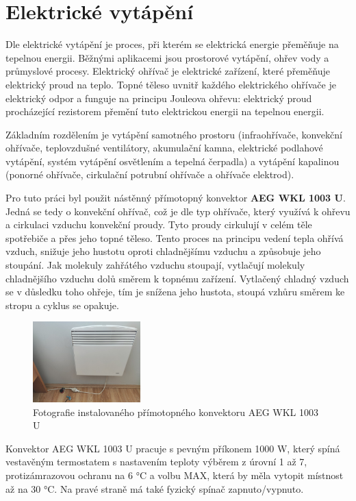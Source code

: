 \section{Elektrické vytápění}
Dle \cite{electricHeating} elektrické vytápění je proces, při kterém se elektrická energie přeměňuje na tepelnou energii. Běžnými aplikacemi jsou prostorové vytápění, ohřev vody a průmyslové procesy. Elektrický ohřívač je elektrické zařízení, které přeměňuje elektrický proud na teplo. Topné těleso uvnitř každého elektrického ohřívače je elektrický odpor a funguje na principu Jouleova ohřevu: elektrický proud procházející rezistorem přemění tuto elektrickou energii na tepelnou energii.

Základním rozdělením je vytápění samotného prostoru (infraohřívače, konvekční ohřívače, teplovzdušné ventilátory, akumulační kamna, elektrické podlahové vytápění, systém vytápění osvětlením a tepelná čerpadla) a vytápění kapalinou (ponorné ohřívače, cirkulační potrubní ohřívače a ohřívače elektrod).

Pro tuto práci byl použit nástěnný přímotopný konvektor \textbf{AEG WKL 1003 U}. Jedná se tedy o konvekční ohřívač, což je dle \cite{convectionHeater} typ ohřívače, který využívá k ohřevu a cirkulaci vzduchu konvekční proudy. Tyto proudy cirkulují v celém těle spotřebiče a přes jeho topné těleso. Tento proces na principu vedení tepla ohřívá vzduch, snižuje jeho hustotu oproti chladnějšímu vzduchu a způsobuje jeho stoupání. Jak molekuly zahřátého vzduchu stoupají, vytlačují molekuly chladnějšího vzduchu dolů směrem k topnému zařízení. Vytlačený chladný vzduch se v důsledku toho ohřeje, tím je snížena jeho hustota, stoupá vzhůru směrem ke stropu a cyklus se opakuje.

\begin{figure}[hbt]
\centering
\includegraphics[width=0.37\textwidth]{obrazky-figures/aeg-wkl-1003u.png}
\caption{Fotografie instalovaného přímotopného konvektoru AEG WKL 1003 U}
\end{figure}


Konvektor AEG WKL 1003 U pracuje s pevným příkonem 1000 W, který spíná vestavěným termostatem s nastavením teploty výběrem z úrovní 1 až 7, protizámrazovou ochranu na 6 °C a volbu MAX, která by měla vytopit místnost až na 30 °C. Na pravé straně má také fyzický spínač zapnuto/vypnuto.


